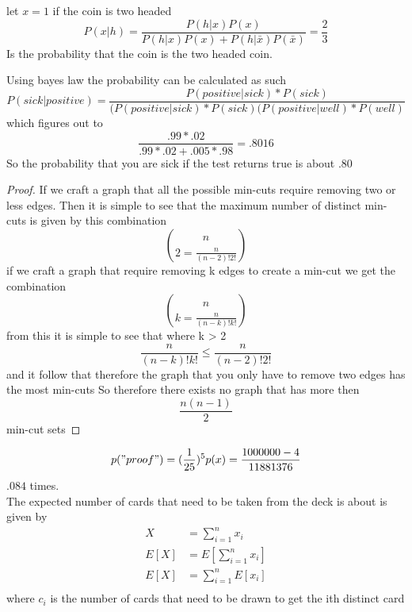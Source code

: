 \documentclass[11pt]{article}
\begin{document}
	\renewcommand{\headrulewidth}{0.4pt}
	\setlength{\headheight}{38.0pt}


	
	let $x = 1$ if the coin is two headed
	$$
	P(x	| h) = \frac{P(h|x) P(x)}{P(h|x) P(x) + P(h|\bar{x}) P(\bar{x})}=
	\frac{2}{3}
	$$
	 Is the probability that the coin is the two headed coin.

	Using bayes law the probability can be calculated as such
	$$
	P(sick|positive) = \frac{P(positive|sick) * P(sick)}{(P(positive|sick) * P(sick)		(P(positive|well) * P(well)}
	$$
	which figures out to
	$$
	\frac{.99*.02}{.99*.02+.005*.98} = .8016
	$$
	So the probability that you are sick if the test returns true is about $.80$
	\bigskip
	
	\begin{proof} If we craft a graph that all the possible min-cuts require removing two or less
		edges. Then it is simple to see that the maximum number of distinct min-cuts is given by this
		combination
		$$
		n\choose{2} = \frac{n}{(n-2)!2!}
		$$
		if we craft a graph that require removing k edges to create a min-cut we get the combination
		$$
		n\choose{k} = \frac{n}{(n-k)!k!}
		$$
		from this it is simple to see that where k > 2
		$$
		\frac{n}{(n-k)!k!} \leq \frac{n}{(n-2)!2!}
		$$
		and it follow that therefore the graph that you only have to remove two edges has the most min-cuts
		So therefore there exists no graph that has more then 
		$$
		\frac{n(n-1)}{2}
		$$
		min-cut sets
	\end{proof}
	
	\bigskip
	$$
	p("proof") = (\frac{1}{25})^5
	p(x) = \frac{1000000-4}{11881376}
	$$
 	$.084$ times.
	\bigskip
	\newpage
	\\
	The expected number of cards that need to be taken from the deck is about is given by
	\begin{align*}	
		X &= \sum\limits_{i=1}^n x_i\\
		E[X] &= E[\sum\limits_{i=1}^n x_i]\\
		E[X] &= \sum\limits_{i=1}^n E[x_i]\\
	\end{align*}
	where $c_i$ is the number of cards that need to be drawn to get the ith distinct card
\end{document}
